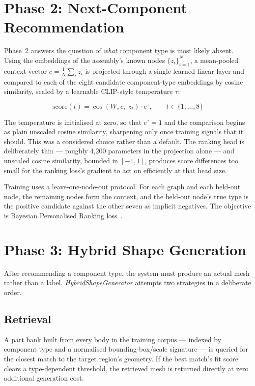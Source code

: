 \documentclass[12pt,oneside,a4paper]{report}
\begin{document}
\section{Phase 2: Next-Component Recommendation}
\label{sec:noderanker}

Phase~2 answers the question of \emph{what} component type is most likely
absent. Using the embeddings of the assembly's known nodes
$\{z_i\}_{i=1}^{N}$, a mean-pooled context vector
$c = \frac{1}{N}\sum_i z_i$ is projected through a single learned linear
layer and compared to each of the eight candidate component-type embeddings
by cosine similarity, scaled by a learnable CLIP-style temperature $\tau$:

\begin{equation}
\text{score}(t) = \cos\!\left(W_c\, c,\; z_t\right) \cdot e^{\tau},
\qquad t \in \{1,\dots,8\}
\label{eq:rankerscore}
\end{equation}

The temperature is initialised at zero, so that $e^{\tau}=1$ and the
comparison begins as plain unscaled cosine similarity, sharpening only once
training signals that it should. This was a considered choice rather than a
default. The ranking head is deliberately thin --- roughly 4,200 parameters
in the projection alone --- and unscaled cosine similarity, bounded in
$[-1,1]$, produces score differences too small for the ranking loss's
gradient to act on efficiently at that head size.

Training uses a leave-one-node-out protocol. For each graph and each held-out
node, the remaining nodes form the context, and the held-out node's true type
is the positive candidate against the other seven as implicit negatives. The
objective is Bayesian Personalised Ranking loss~\cite{rendle2009bpr}.

\section{Phase 3: Hybrid Shape Generation}
\label{sec:shapegen}

After recommending a component type, the system must produce an actual mesh
rather than a label. \textit{HybridShapeGenerator} attempts two strategies in
a deliberate order.

\subsection{Retrieval}

A part bank built from every body in the training corpus --- indexed by
component type and a normalised bounding-box/scale signature --- is queried
for the closest match to the target region's geometry. If the best match's
fit score clears a type-dependent threshold, the retrieved mesh is returned
directly at zero additional generation cost.
\end{document}
